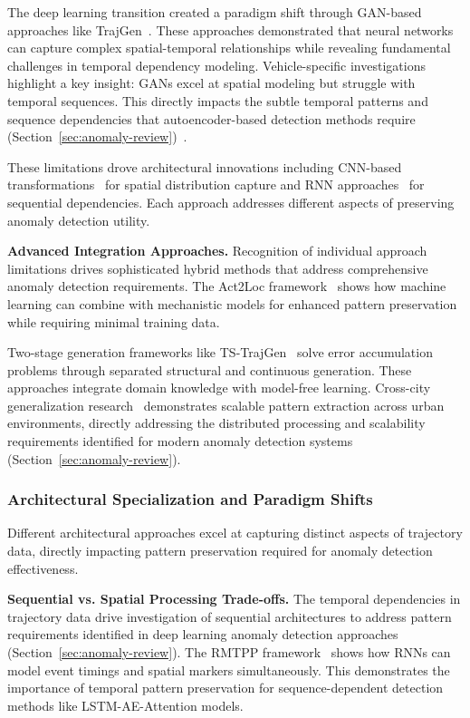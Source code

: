 \documentclass[runningheads]{llncs}
\begin{document}
The deep learning transition created a paradigm shift through GAN-based approaches like TrajGen~\cite{cao2021generating}. These approaches demonstrated that neural networks can capture complex spatial-temporal relationships while revealing fundamental challenges in temporal dependency modeling. Vehicle-specific investigations~\cite{bajarunas2022generative} highlight a key insight: GANs excel at spatial modeling but struggle with temporal sequences. This directly impacts the subtle temporal patterns and sequence dependencies that autoencoder-based detection methods require (Section~\ref{sec:anomaly-review})~\cite{huang2021lstm}.

These limitations drove architectural innovations including CNN-based transformations~\cite{merhi2024synthetic} for spatial distribution capture and RNN approaches~\cite{du2016recurrent} for sequential dependencies. Each approach addresses different aspects of preserving anomaly detection utility.

\textbf{Advanced Integration Approaches.} Recognition of individual approach limitations drives sophisticated hybrid methods that address comprehensive anomaly detection requirements. The Act2Loc framework~\cite{liu2023act2loc} shows how machine learning can combine with mechanistic models for enhanced pattern preservation while requiring minimal training data.

Two-stage generation frameworks like TS-TrajGen~\cite{jiang2023continuous} solve error accumulation problems through separated structural and continuous generation. These approaches integrate domain knowledge with model-free learning. Cross-city generalization research~\cite{wang2025gtg} demonstrates scalable pattern extraction across urban environments, directly addressing the distributed processing and scalability requirements identified for modern anomaly detection systems (Section~\ref{sec:anomaly-review}).

\subsubsection{Architectural Specialization and Paradigm Shifts}

Different architectural approaches excel at capturing distinct aspects of trajectory data, directly impacting pattern preservation required for anomaly detection effectiveness.

\textbf{Sequential vs. Spatial Processing Trade-offs.} The temporal dependencies in trajectory data drive investigation of sequential architectures to address pattern requirements identified in deep learning anomaly detection approaches (Section~\ref{sec:anomaly-review}). The RMTPP framework~\cite{du2016recurrent} shows how RNNs can model event timings and spatial markers simultaneously. This demonstrates the importance of temporal pattern preservation for sequence-dependent detection methods like LSTM-AE-Attention models.
\end{document}
